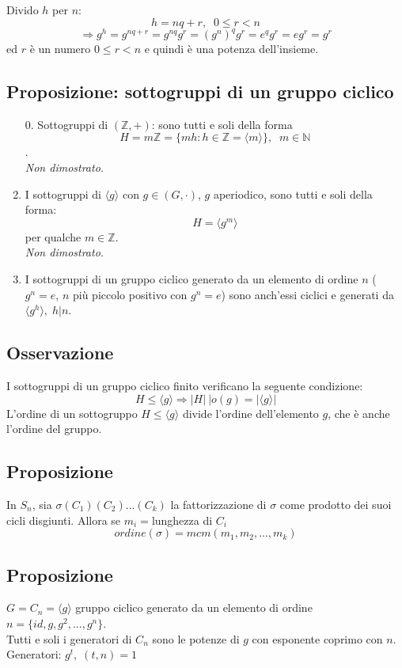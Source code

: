 Divido \(h\) per \(n\):
\[h=nq+r,\;\;0\leq r<n\]
\[\Rightarrow g^h=g^{nq+r}=g^{nq}g^r=(g^n)^qg^r=e^qg^r=eg^r=g^r\]
ed \(r\) è un numero \(0\leq r<n\) e quindi è una potenza dell'insieme.

\subsection{Proposizione: sottogruppi di un gruppo ciclico}
\begin{enumerate}
	
	\item[0.] Sottogruppi di \((\mathbb{Z},+)\): sono tutti e soli della forma \[H=m\mathbb{Z}=\{mh:h\in\mathbb{Z}=\langle m\rangle\},\;\;m\in\mathbb{N}\].
	\\\textit{Non dimostrato.}

	\item I sottogruppi di \(\langle g\rangle\) con \(g\in (G,\cdot)\), \(g\) aperiodico, sono tutti e soli della forma:
	\[H=\langle g^m\rangle\]
	per qualche \(m\in\mathbb{Z}\).
	\\\textit{Non dimostrato.}

	\item I sottogruppi di un gruppo ciclico generato da un elemento di ordine \(n\) (\(g^n=e\), \(n\) più piccolo positivo con \(g^n=e\)) sono anch'essi ciclici e generati da \(\langle g^h\rangle,\; h|n\).

\end{enumerate}

\subsection{Osservazione}
I sottogruppi di un gruppo ciclico finito verificano la seguente condizione:
\[H\leq\langle g\rangle\Rightarrow\vert H|\:| o(g)=|\langle g\rangle|\]
L'ordine di un sottogruppo \(H\leq\langle g\rangle\) divide l'ordine dell'elemento \(g\), che è anche l'ordine del gruppo.

\subsection{Proposizione}
In \(S_n\), sia \(\sigma (C_1)(C_2)...(C_k)\) la fattorizzazione di \(\sigma\) come prodotto dei suoi cicli disgiunti. Allora se \(m_i=\)lunghezza di \(C_i\)
\[ordine(\sigma)=mcm(m_1,m_2,...,m_k)\]

\subsection{Proposizione}
\(G=C_n=\langle g\rangle\) gruppo ciclico generato da un elemento di ordine \(n=\{id,g,g^2,...,g^n\}\). 
\\Tutti e soli i generatori di \(C_n\) sono le potenze di \(g\) con esponente coprimo con \(n\).
\\Generatori: \(g^t,\;(t,n)=1\)


